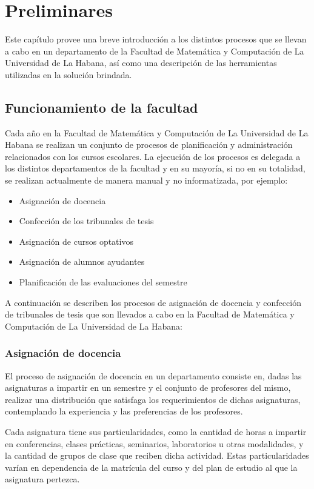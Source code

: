 \chapter{Preliminares}\label{chapter:preliminaries}
Este capítulo provee una breve introducción a los distintos 
procesos que se llevan a cabo en un departamento de la Facultad
de Matemática y Computación de La Universidad de La Habana, así
como una descripción de las herramientas utilizadas en la 
solución brindada. 

\section{Funcionamiento de la facultad}
Cada año en la Facultad de Matemática y Computación de La 
Universidad de La Habana se realizan un conjunto de procesos de 
planificación y administración relacionados con los cursos escolares.
La ejecución de los procesos es delegada a los distintos
departamentos de la facultad y en su mayoría, si no en su totalidad,
se realizan actualmente de manera manual y no informatizada,
por ejemplo:

\begin{itemize}
    \item Asignación de docencia
    \item Confección de los tribunales de tesis 
    \item Asignación de cursos optativos
    \item Asignación de alumnos ayudantes
    \item Planificación de las evaluaciones del semestre
\end{itemize}


A continuación se describen los procesos de asignación de docencia y 
confección de tribunales de tesis que son llevados
a cabo en la Facultad de Matemática y Computación de La 
Universidad de La Habana:

\subsection{Asignación de docencia}
El proceso de asignación de docencia en un departamento consiste en, 
dadas las asignaturas a impartir en un semestre y el conjunto de 
profesores del mismo, realizar una distribución que satisfaga los
requerimientos de dichas asignaturas, contemplando la experiencia y 
las preferencias de los profesores.

Cada asignatura tiene sus particularidades, como la cantidad de horas
a impartir en conferencias, clases prácticas, seminarios, laboratorios u
otras modalidades, y la cantidad de grupos de clase que reciben dicha 
actividad. Estas particularidades varían en dependencia de la matrícula 
del curso y del plan de estudio al que la asignatura pertezca.

